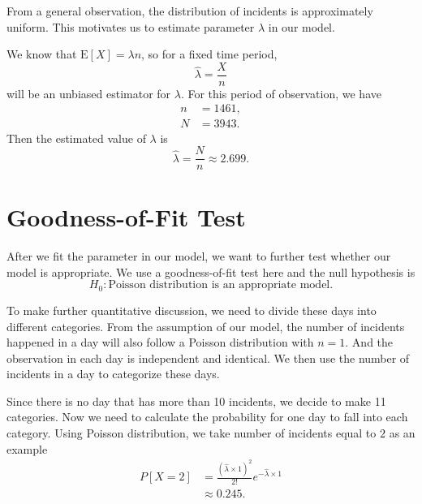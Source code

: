 \documentclass[11pt,a4paper,english]{article}
\begin{document}
From a general observation, the distribution of incidents is approximately uniform. This motivates us to estimate parameter $\lambda$ in our model.

We know that $\text{E}[X] = \lambda n$, so for a fixed time period,
\begin{equation*}
	\hat{\lambda} = \frac{X}{n}
\end{equation*}
will be an unbiased estimator for $\lambda$. For this period of observation, we have 
\begin{align*}
	n &= 1461,\\
	N &= 3943.
\end{align*}
Then the estimated value of $\lambda$ is
\begin{equation*}
	\hat{\lambda} = \frac{N}{n} \approx 2.699.
\end{equation*}

\section{Goodness-of-Fit Test}
After we fit the parameter in our model, we want to further test whether our model is appropriate. We use a goodness-of-fit test here and the null hypothesis is
\begin{equation*}
	H_{0}:\text{Poisson distribution is an appropriate model.}
\end{equation*}

To make further quantitative discussion, we need to divide these days into different categories. 
From the assumption of our model, the number of incidents happened in a day will also follow a Poisson distribution with $n = 1$. 
And the observation in each day is independent and identical. We then use the number of incidents in a day to categorize these days.

Since there is no day that has more than 10 incidents, we decide to make 11 categories. Now we need to calculate the probability for one day to fall into each category. Using Poisson distribution, we take number of incidents equal to $2$ as an example
\begin{align*}
	P[X = 2] &= \frac{\left(\hat{\lambda}\times 1\right)^{2}}{2!}
	e^{-\hat{\lambda} \times 1} \\
	&\approx 0.245.
\end{align*}
\end{document}
